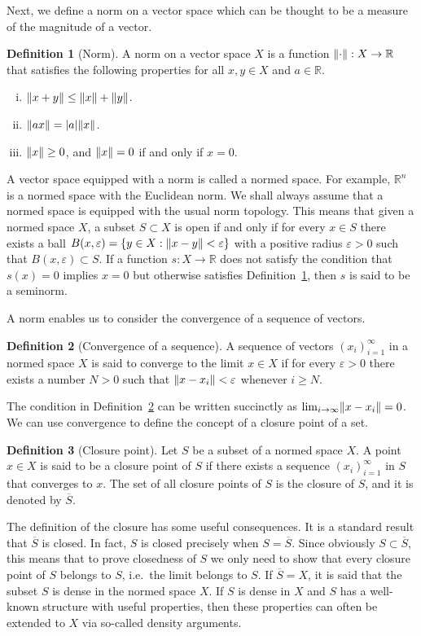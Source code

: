 \documentclass[english, 12pt, a4paper, sci, utf8, a-2b, online]{aaltothesis}
\theoremstyle{definition}
\newtheorem{definition}{Definition}[section]
\theoremstyle{plain}
\DeclarePairedDelimiter\abs{\lvert}{\rvert}
\DeclarePairedDelimiter\norm{\lVert}{\rVert}
\numberwithin{equation}{section}
\begin{document}
Next, we define a norm on a vector space which can be thought to be a measure
of the magnitude of a vector.
\begin{definition}[Norm]
    \label{def:norm}
    A norm on a vector space $X$ is a function $\norm{\cdot}: X \to \mathbb{R}$
    that satisfies the following properties for all $x,y \in X$
    and $a \in \mathbb{R}$.
    \begin{enumerate}[(i)]
        \item $\norm{x+y} \leq \norm{x} + \norm{y}$.
        \item $\norm{ax} = \abs{a} \norm{x}$.
        \item $\norm{x} \geq 0$, and $\norm{x}=0$ if and only if $x=0$.
    \end{enumerate}
\end{definition}
A vector space equipped with a norm is called a normed space.
For example, $\mathbb{R}^n$ is a normed space with the Euclidean norm.
We shall always assume that a normed space is equipped with the usual
norm topology. This means that given a normed space $X$, a subset $S \subset X$
is open if and only if for every $x \in S$ there exists a ball
$B(x,\varepsilon) = \{ y \in X : \norm{x-y} < \varepsilon \}$ with a positive
radius $\varepsilon > 0$ such that $B(x,\varepsilon) \subset S$.
If a function $s: X \to \mathbb{R}$ does not satisfy the condition
that $s(x) = 0$ implies $x = 0$ but otherwise satisfies Definition~\ref{def:norm},
then $s$ is said to be a seminorm.

A norm enables us to consider the convergence of a sequence of vectors.
\begin{definition}[Convergence of a sequence]
    \label{def:convergence}
    A sequence of vectors $(x_i)_{i=1}^{\infty}$ in a normed space $X$
    is said to converge to the limit $x \in X$ if for every $\varepsilon > 0$ 
    there exists a number $N > 0$
    such that $\norm{x-x_i} < \varepsilon$ whenever $i \geq N$.
\end{definition}
The condition in Definition~\ref{def:convergence} can be written succinctly
as $\lim_{i \to \infty} \norm{x-x_i} = 0$.
We can use convergence to define the concept of a closure point of a set.
\begin{definition}[Closure point]
    \label{def:closure_point}
    Let $S$ be a subset of a normed space $X$.
    A point $x \in X$ is said to be a closure point of $S$
    if there exists a sequence $(x_i)_{i=1}^{\infty}$ in $S$
    that converges to $x$.
    The set of all closure points of $S$ is the closure of $S$,
    and it is denoted by $\overline{S}$.
\end{definition}
The definition of the closure has some useful consequences.
It is a standard result that $\overline{S}$ is closed.
In fact, $S$ is closed precisely when $S = \overline{S}$.
Since obviously $S \subset \overline{S}$,
this means that to prove closedness of $S$ we only need to show that
every closure point of $S$ belongs to $S$, i.e.\ the limit belongs to $S$.
If $\overline{S} = X$, it is said that the subset $S$ is dense in the
normed space $X$. If $S$ is dense in $X$ and $S$ has a well-known structure
with useful properties, then these properties can often be extended to $X$
via so-called density arguments.
\end{document}
